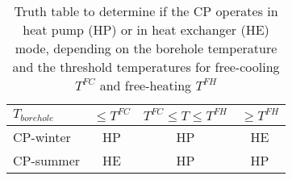 \begin{table}[h!]
	\centering
	\caption{Truth table to determine if the CP operates in heat pump (HP) or in heat exchanger (HE) mode, depending on the borehole temperature and the threshold temperatures for free-cooling $T^{FC}$ and free-heating $T^{FH}$}\vspace{2mm}
	\label{tab:CP_tt} 
\begin{tabular}{lccc} \toprule
	$T_{borehole}$ & $\leq T^{FC}$ & $T^{FC} \leq T \leq T^{FH}$ & $\geq T^{FH}$ \\ \midrule
	CP-winter      & HP                             & HP                                                           & HE                             \\
	CP-summer      & HE                             & HP                                                           & HP                          \\ \bottomrule  
\end{tabular}
\end{table}